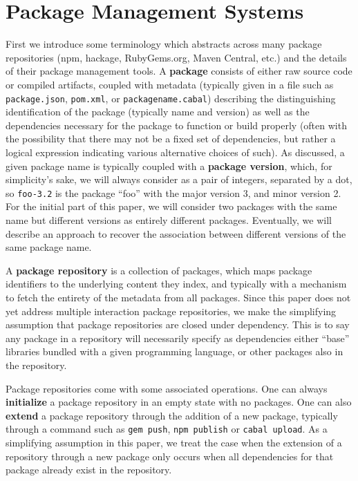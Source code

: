 \documentclass[hoptionsi,review,screen,format=sigconf]{acmart}
\theoremstyle{definition}
\begin{document}
\section{Package Management Systems}
First we introduce some terminology which abstracts across many package repositories (npm, hackage, RubyGems.org, Maven Central, etc.) and the details of their package management tools. A \textbf{package} consists of either raw source code or compiled artifacts, coupled with metadata (typically given in a file such as \texttt{package.json},  \texttt{pom.xml}, or \texttt{packagename.cabal}) describing the distinguishing identification of the package (typically name and version) as well as the dependencies necessary for the package to function or build properly (often with the possibility that there may not be a fixed set of dependencies, but rather a logical expression indicating various alternative choices of such). As discussed, a given package name is typically coupled with a \textbf{package version}, which, for simplicity's sake, we will always consider as a pair of integers, separated by a dot, so \texttt{foo-3.2} is the package ``foo'' with the major version 3, and minor version 2. For the initial part of this paper, we will consider two packages with the same name but different versions as entirely different packages. Eventually, we will describe an approach to recover the association between different versions of the same package name.

A \textbf{package repository} is a collection of packages, which maps package identifiers to the underlying content they index, and typically with a mechanism to fetch the entirety of the metadata from all packages. Since this paper does not yet address multiple interaction package repositories, we make the simplifying assumption that package repositories are closed under dependency. This is to say any package in a repository will necessarily specify as dependencies either ``base'' libraries bundled with a given programming language, or other packages also in the repository. 

Package repositories come with some associated operations. One can always \textbf{initialize} a package repository in an empty state with no packages. One can also \textbf{extend} a package repository through the addition of a new package, typically through a command such as \texttt{gem push}, \texttt{npm publish} or \texttt{cabal upload}. As a simplifying assumption in this paper, we treat the case when the extension of a repository through a new package only occurs when all dependencies for that package already exist in the repository.
\end{document}
